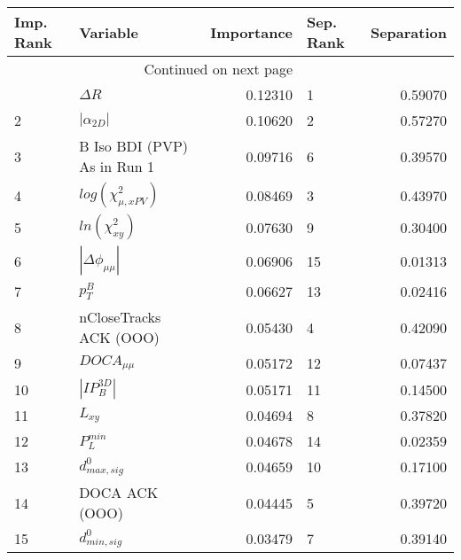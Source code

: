 \usepackage{lscape}

\begin{landscape}
\begin{longtable}{llrlr}
\toprule
Imp. Rank &                     Variable &  Importance & Sep. Rank &  Separation \\
\midrule
\endhead
\midrule
\multicolumn{3}{r}{{Continued on next page}} \\
\midrule
\endfoot

\bottomrule
\endlastfoot
        1 &                   $\Delta R$ &     0.12310 &         1 &     0.59070 \\
        2 &              $|\alpha_{2D}|$ &     0.10620 &         2 &     0.57270 \\
        3 &  B Iso BDI (PVP) As in Run 1 &     0.09716 &         6 &     0.39570 \\
        4 &    $log(\chi^{2}_{\mu,xPV})$ &     0.08469 &         3 &     0.43970 \\
        5 &          $ln(\chi^{2}_{xy})$ &     0.07630 &         9 &     0.30400 \\
        6 &     $|\Delta \phi_{\mu\mu}|$ &     0.06906 &        15 &     0.01313 \\
        7 &                    $p^B_{T}$ &     0.06627 &        13 &     0.02416 \\
        8 &       nCloseTracks ACK (OOO) &     0.05430 &         4 &     0.42090 \\
        9 &              $DOCA_{\mu\mu}$ &     0.05172 &        12 &     0.07437 \\
       10 &              $|IP_{B}^{3D}|$ &     0.05171 &        11 &     0.14500 \\
       11 &                     $L_{xy}$ &     0.04694 &         8 &     0.37820 \\
       12 &                $P^{min}_{L}$ &     0.04678 &        14 &     0.02359 \\
       13 &             $d^0_{max, sig}$ &     0.04659 &        10 &     0.17100 \\
       14 &               DOCA ACK (OOO) &     0.04445 &         5 &     0.39720 \\
       15 &             $d^0_{min, sig}$ &     0.03479 &         7 &     0.39140 \\
\end{longtable}

\end{landscape}

